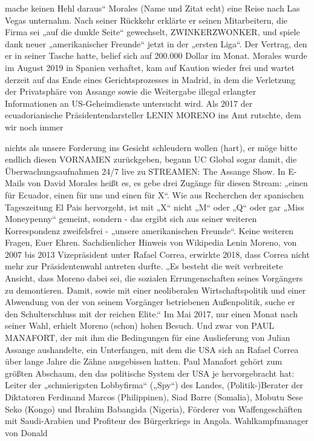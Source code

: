 \begin{multicols}{2}
mache keinen Hehl daraus“ Morales (Name und Zitat
echt) eine Reise nach Las Vegas unternahm. Nach seiner
Rückkehr erklärte er seinen Mitarbeitern, die Firma sei
„auf die dunkle Seite“ gewechselt, ZWINKERZWONKER,
und spiele dank neuer „amerikanischer Freunde“ jetzt
in der „ersten Liga“. Der Vertrag, den er in seiner Tasche
hatte, belief sich auf 200.000 Dollar im Monat. Morales
wurde im August 2019 in Spanien verhaftet, kam auf
Kaution wieder frei und wartet derzeit auf das Ende eines Gerichtsprozesses in Madrid, in dem die Verletzung
der Privatsphäre von Assange sowie die Weitergabe illegal erlangter Informationen an US-Geheimdienste untersucht wird.
Als 2017 der ecuadorianische Präsidentendarsteller LENIN MORENO ins Amt rutschte, dem wir noch immer

nichts als unsere Forderung ins Gesicht schleudern wollen (hart), er möge bitte endlich diesen VORNAMEN
zurückgeben, begann UC Global sogar damit, die Überwachungsaufnahmen 24/7 live zu STREAMEN: The Assange Show. In E-Mails von David Morales heißt es, es
gebe drei Zugänge für diesen Stream: „einen für Ecuador, einen für uns und einen für X“. Wie aus Recherchen
der spanischen Tageszeitung El Pais hervorgeht, ist mit
„X“ nicht „M“ oder „Q“ oder gar „Miss Moneypenny“
gemeint, sondern - das ergibt sich aus seiner weiteren
Korrespondenz zweifelsfrei - „unsere amerikanischen
Freunde“. Keine weiteren Fragen, Euer Ehren.
Sachdienlicher Hinweis von Wikipedia
Lenin Moreno, von 2007 bis 2013 Vizepräsident unter Rafael Correa, erwirkte 2018, dass Correa nicht mehr zur
Präsidentenwahl antreten durfte. „Es besteht die weit verbreitete Ansicht, dass Moreno dabei sei, die sozialen Errungenschaften seines Vorgängers zu demontieren. Damit, sowie mit einer neoliberalen Wirtschaftspolitik und
einer Abwendung von der von seinem Vorgänger betriebenen Außenpolitik, suche er den Schulterschluss mit der
reichen Elite.“
Im Mai 2017, nur einen Monat nach seiner Wahl, erhielt
Moreno (schon) hohen Besuch. Und zwar von PAUL MANAFORT, der mit ihm die Bedingungen für eine Auslieferung von Julian Assange aushandelte, ein Unterfangen,
mit dem die USA sich an Rafael Correa über lange Jahre
die Zähne ausgebissen hatten.
Paul Manafort gehört zum größten Abschaum, den das
politische System der USA je hervorgebracht hat: Leiter der „schmierigsten Lobbyfirma“ („Spy“) des Landes, (Politik-)Berater der Diktatoren Ferdinand Marcos
(Philippinen), Siad Barre (Somalia), Mobutu Sese Seko
(Kongo) und Ibrahim Babangida (Nigeria), Förderer von
Waffengeschäften mit Saudi-Arabien und Profiteur des
Bürgerkriegs in Angola. Wahlkampfmanager von Donald

\end{multicols}
